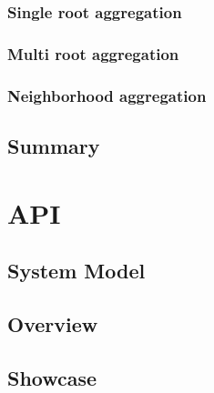 \subsubsection{Single root aggregation}

\subsubsection{Multi root aggregation}

\subsubsection{Neighborhood aggregation}

\subsection{Summary}

\section{API}

\subsection{System Model}

\subsection{Overview}

\subsection{Showcase}